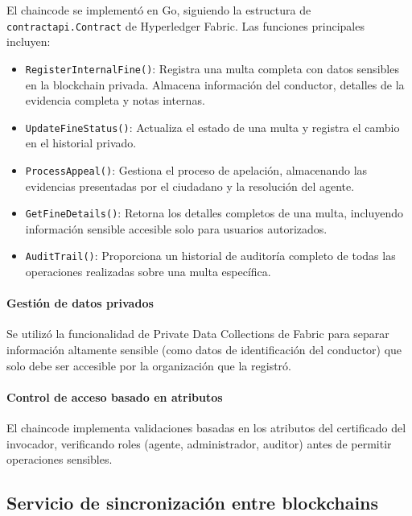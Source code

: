 El chaincode se implementó en Go, siguiendo la estructura de \texttt{contractapi.Contract} de Hyperledger Fabric. Las funciones principales incluyen:

\begin{itemize}
    \item \texttt{RegisterInternalFine()}: Registra una multa completa con datos sensibles en la blockchain privada. Almacena información del conductor, detalles de la evidencia completa y notas internas.
    
    \item \texttt{UpdateFineStatus()}: Actualiza el estado de una multa y registra el cambio en el historial privado.
    
    \item \texttt{ProcessAppeal()}: Gestiona el proceso de apelación, almacenando las evidencias presentadas por el ciudadano y la resolución del agente.
    
    \item \texttt{GetFineDetails()}: Retorna los detalles completos de una multa, incluyendo información sensible accesible solo para usuarios autorizados.
    
    \item \texttt{AuditTrail()}: Proporciona un historial de auditoría completo de todas las operaciones realizadas sobre una multa específica.
\end{itemize}

\paragraph{Gestión de datos privados}
Se utilizó la funcionalidad de Private Data Collections de Fabric para separar información altamente sensible (como datos de identificación del conductor) que solo debe ser accesible por la organización que la registró.

\paragraph{Control de acceso basado en atributos}
El chaincode implementa validaciones basadas en los atributos del certificado del invocador, verificando roles (agente, administrador, auditor) antes de permitir operaciones sensibles.

\subsection{Servicio de sincronización entre blockchains}

